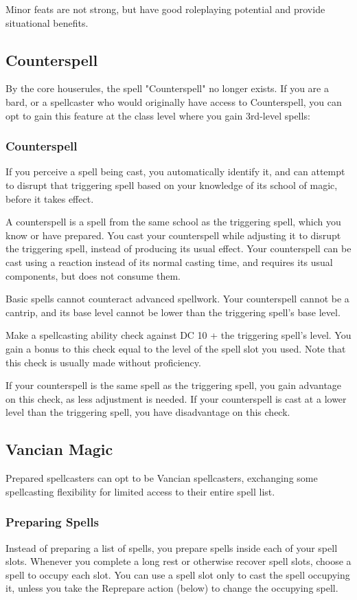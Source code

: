 \documentclass[letterpaper,twocolumn,openany,nodeprecatedcode,bg=print]{dndbook}
\begin{document}
Minor feats are not strong, but have good roleplaying potential and provide situational benefits.

\subsection{Counterspell}
\label{counterspell}
By the core houserules, the spell "Counterspell" no longer exists. 
If you are a bard, or a spellcaster who would originally have access to Counterspell, 
you can opt to gain this feature at the class level where you gain 3rd-level spells:

\subsubsection{Counterspell}
If you perceive a spell being cast, 
you automatically identify it, 
and can attempt to disrupt that triggering spell based on your knowledge of its school of magic, before it takes effect.

A counterspell is a spell from the same school as the triggering spell, which you know or have prepared. 
You cast your counterspell while adjusting it to disrupt the triggering spell, instead of producing its usual effect. 
Your counterspell can be cast using a reaction instead of its normal casting time, 
and requires its usual components, but does not consume them.

Basic spells cannot counteract advanced spellwork. 
Your counterspell cannot be a cantrip, 
and its base level cannot be lower than the triggering spell's base level.

Make a spellcasting ability check against DC 10 + the triggering spell's level. 
You gain a bonus to this check equal to the level of the spell slot you used. 
Note that this check is usually made without proficiency.

If your counterspell is the same spell as the triggering spell, you gain advantage on this check, as less adjustment is needed. 
If your counterspell is cast at a lower level than the triggering spell, you have disadvantage on this check.

\subsection{Vancian Magic}
Prepared spellcasters can opt to be Vancian spellcasters, 
exchanging some spellcasting flexibility for limited access to their entire spell list.

\subsubsection{Preparing Spells}
Instead of preparing a list of spells, you prepare spells inside each of your spell slots. 
Whenever you complete a long rest or otherwise recover spell slots, choose a spell to occupy each slot. 
You can use a spell slot only to cast the spell occupying it, unless you take the Reprepare action (below) to change the occupying spell.
\end{document}
